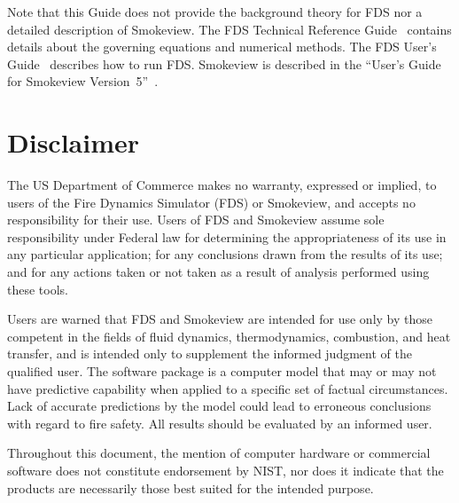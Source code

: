 \documentclass[11pt]{book}
\begin{document}
Note that this Guide does not provide the background theory for FDS nor a detailed description of Smokeview. The FDS
Technical Reference Guide~\cite{FDS_Tech_Guide_5} contains details about the governing
equations and numerical methods. The FDS User's Guide~\cite{FDS_Users_Guide_5} describes how to run FDS. Smokeview is described in the ``User's Guide for
Smokeview Version~5''~\cite{Smokeview_Users_Guide_5}.


\chapter{Disclaimer}

The US Department of Commerce makes no warranty, expressed or implied, to
users of the Fire Dynamics Simulator (FDS) or Smokeview, and accepts no responsibility for their
use. Users of FDS and Smokeview assume sole responsibility under Federal law for
determining the appropriateness of its use in any particular application;
for any conclusions drawn from the results of its use; and for any actions
taken or not taken as a result of analysis performed using these tools.

Users are warned that FDS and Smokeview are intended for use only by those competent in
the fields of fluid dynamics, thermodynamics, combustion, and heat transfer,
and is intended only to supplement the
informed judgment of the qualified user. The software package is a
computer model that may or may not have predictive capability when applied
to a specific set of factual circumstances. Lack of accurate predictions by
the model could lead to erroneous conclusions with regard to fire safety.
All results should be evaluated by an informed user.

Throughout this document, the mention of computer hardware or
commercial software does not constitute endorsement by NIST, nor does
it indicate that the products are necessarily those best suited for the
intended purpose.

\tableofcontents
\listoffigures

\mainmatter

\end{document}
